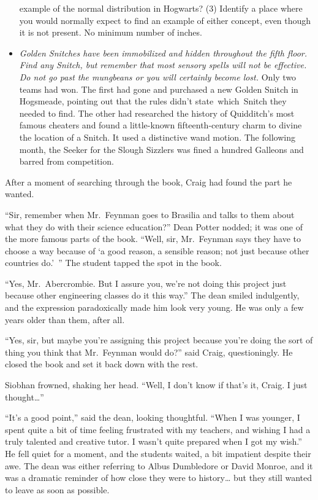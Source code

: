 \begin{itemize}
{  example of the normal distribution in Hogwarts? (3) Identify a place
  where you would normally expect to find an example of either concept,
  even though it is not present. No minimum number of inches.}
\item
  \emph{Golden Snitches have been immobilized and hidden throughout the
  fifth floor. Find any Snitch, but remember that most sensory spells
  will not be effective. Do not go past the mungbeans or you will
  certainly become lost.} Only two teams had won. The first had gone and
  purchased a new Golden Snitch in Hogsmeade, pointing out that the
  rules didn't state~which~Snitch they needed to find. The other had
  researched the history of Quidditch's most famous cheaters and found a
  little-known fifteenth-century charm to divine the location of a
  Snitch. It used a distinctive wand motion. The following month, the
  Seeker for the Slough Sizzlers was fined a hundred Galleons and barred
  from competition.
\end{itemize}

After a moment of searching through the book, Craig had found the part
he wanted.

``Sir, remember when Mr.~Feynman goes to Brasilia and talks to them
about what they do with their science education?'' Dean Potter nodded;
it was one of the more famous parts of the book. ``Well, sir,
Mr.~Feynman says they have to choose a way because of `a good reason, a
sensible reason; not just because other countries do.'~'' The student
tapped the spot in the book.

``Yes, Mr.~Abercrombie. But I assure you, we're not doing this project
just because other engineering classes do it this way.'' The dean smiled
indulgently, and the expression paradoxically made him look very young.
He was only a few years older than them, after all.

``Yes, sir, but maybe you're assigning this project because you're doing
the sort of thing you think that Mr.~Feynman would do?'' said Craig,
questioningly. He closed the book and set it back down with the rest.

Siobhan frowned, shaking her head. ``Well, I don't know if that's it,
Craig. I just thought\ldots{}''

``It's a good point,'' said the dean, looking thoughtful. ``When I was
younger, I spent quite a bit of time feeling frustrated with my
teachers, and wishing I had a truly talented and creative tutor. I
wasn't quite prepared when I got my wish.'' He fell quiet for a moment,
and the students waited, a bit impatient despite their awe. The dean was
either referring to Albus Dumbledore or David Monroe, and it was a
dramatic reminder of how close they were to history\ldots{} but they
still wanted to leave as soon as possible.

